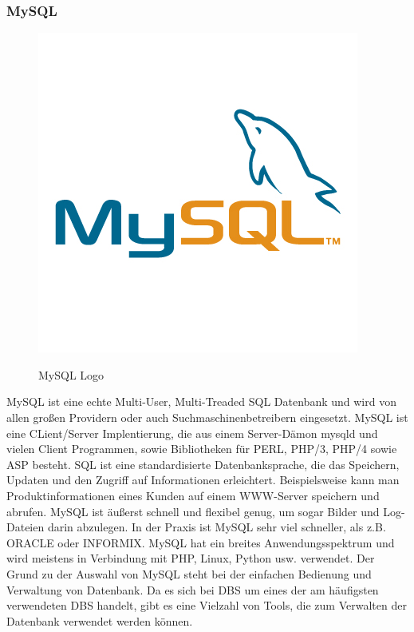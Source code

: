 \subsubsection{MySQL}
\begin{figure}
	\centering
	\includegraphics[scale=0.3]{./figures/mysql.jpg}
	\caption{ MySQL Logo}
	\label{fig:mysql}
	\cite{MySQLlogo}
\end{figure}
MySQL ist eine echte Multi-User, Multi-Treaded SQL Datenbank und wird von allen großen
Providern oder auch Suchmaschinenbetreibern eingesetzt. MySQL ist eine CLient/Server
Implentierung, die aus einem Server-Dämon mysqld und vielen Client Programmen, sowie
Bibliotheken für PERL, PHP/3, PHP/4 sowie ASP besteht.
SQL ist eine standardisierte Datenbanksprache, die das Speichern, Updaten und den Zugriff auf
Informationen erleichtert. Beispielsweise kann man Produktinformationen eines Kunden auf einem
WWW-Server speichern und abrufen. MySQL ist äußerst schnell und flexibel genug, um sogar Bilder
und Log-Dateien darin abzulegen. In der Praxis ist MySQL sehr viel schneller, als z.B. ORACLE oder INFORMIX.\cite{stepken1999mysql}
\bigbreak
MySQL hat ein breites Anwendungsspektrum und wird meistens in Verbindung mit PHP, Linux, Python usw. verwendet. Der Grund zu der Auswahl von MySQL steht bei der einfachen Bedienung und Verwaltung von Datenbank. Da es sich bei DBS um eines der am häufigsten verwendeten DBS handelt, gibt es eine Vielzahl von Tools, die zum Verwalten der Datenbank verwendet werden können.

